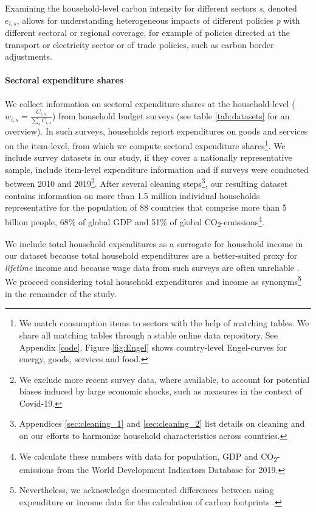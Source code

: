 \documentclass[12pt, a4paper]{article}
\begin{document}
Examining the household-level carbon intensity for different sectors \textit{s}, denoted $e_{i,s}$, allows for understanding heterogeneous impacts of different policies \textit{p} with different sectoral or regional coverage, for example of policies directed at the transport or electricity sector or of trade policies, such as carbon border adjustments.

\paragraph{Sectoral expenditure shares} We collect information on sectoral expenditure shares at the household-level ($w_{i,s}=\frac{C_{i,s}}{\sum_{s}C_{i,s}}$) from household budget surveys (see table \ref{tab:datasets} for an overview). In such surveys, households report expenditures on goods and services on the item-level, from which we compute sectoral expenditure shares\footnote{We match consumption items to sectors with the help of matching tables. We share all matching tables through a stable online data repository. See Appendix \ref{code}. Figure \ref{fig:Engel} shows country-level Engel-curves for energy, goods, services and food.}. We include survey datasets in our study, if they cover a nationally representative sample, include item-level expenditure information and if surveys were conducted between 2010 and 2019\footnote{We exclude more recent survey data, where available, to account for potential biases induced by large economic shocks, such as measures in the context of Covid-19.}. After several cleaning steps\footnote{Appendices \ref{sec:cleaning_1} and \ref{sec:cleaning_2} list details on cleaning and on our efforts to harmonize household characteristics across countries.}, our resulting dataset contains information on more than 1.5 million individual households representative for the population of 88 countries that comprise more than 5 billion people, 68\% of global GDP and 51\% of global CO\textsubscript{2}-emissions\footnote{We calculate these numbers with data for population, GDP and CO\textsubscript{2}-emissions from the World Development Indicators Database \autocite{WorldBankGroup.2023} for 2019.}.

We include total household expenditures as a surrogate for household income in our dataset because total household expenditures are a better-suited proxy for \textit{lifetime} income \autocite{Poterba.1989,Poterba.1991,Cronin.2019} and because wage data from such surveys are often unreliable \autocite{Blundell.1998}. We proceed considering total household expenditures and income as synonyms\footnote{Nevertheless, we acknowledge documented differences between using expenditure or income data for the calculation of carbon footprints \autocite[see][]{Levay.2023}.} in the remainder of the study.
\end{document}
